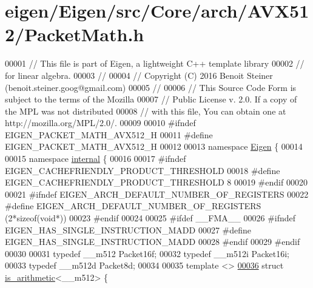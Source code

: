 \hypertarget{eigen_2_eigen_2src_2_core_2arch_2_a_v_x512_2_packet_math_8h_source}{}\section{eigen/\+Eigen/src/\+Core/arch/\+A\+V\+X512/\+Packet\+Math.h}
\label{eigen_2_eigen_2src_2_core_2arch_2_a_v_x512_2_packet_math_8h_source}

\begin{DoxyCode}
00001 \textcolor{comment}{// This file is part of Eigen, a lightweight C++ template library}
00002 \textcolor{comment}{// for linear algebra.}
00003 \textcolor{comment}{//}
00004 \textcolor{comment}{// Copyright (C) 2016 Benoit Steiner (benoit.steiner.goog@gmail.com)}
00005 \textcolor{comment}{//}
00006 \textcolor{comment}{// This Source Code Form is subject to the terms of the Mozilla}
00007 \textcolor{comment}{// Public License v. 2.0. If a copy of the MPL was not distributed}
00008 \textcolor{comment}{// with this file, You can obtain one at http://mozilla.org/MPL/2.0/.}
00009 
00010 \textcolor{preprocessor}{#ifndef EIGEN\_PACKET\_MATH\_AVX512\_H}
00011 \textcolor{preprocessor}{#define EIGEN\_PACKET\_MATH\_AVX512\_H}
00012 
00013 \textcolor{keyword}{namespace }\hyperlink{namespace_eigen}{Eigen} \{
00014 
00015 \textcolor{keyword}{namespace }\hyperlink{namespaceinternal}{internal} \{
00016 
00017 \textcolor{preprocessor}{#ifndef EIGEN\_CACHEFRIENDLY\_PRODUCT\_THRESHOLD}
00018 \textcolor{preprocessor}{#define EIGEN\_CACHEFRIENDLY\_PRODUCT\_THRESHOLD 8}
00019 \textcolor{preprocessor}{#endif}
00020 
00021 \textcolor{preprocessor}{#ifndef EIGEN\_ARCH\_DEFAULT\_NUMBER\_OF\_REGISTERS}
00022 \textcolor{preprocessor}{#define EIGEN\_ARCH\_DEFAULT\_NUMBER\_OF\_REGISTERS (2*sizeof(void*))}
00023 \textcolor{preprocessor}{#endif}
00024 
00025 \textcolor{preprocessor}{#ifdef \_\_FMA\_\_}
00026 \textcolor{preprocessor}{#ifndef EIGEN\_HAS\_SINGLE\_INSTRUCTION\_MADD}
00027 \textcolor{preprocessor}{#define EIGEN\_HAS\_SINGLE\_INSTRUCTION\_MADD}
00028 \textcolor{preprocessor}{#endif}
00029 \textcolor{preprocessor}{#endif}
00030 
00031 \textcolor{keyword}{typedef} \_\_m512 Packet16f;
00032 \textcolor{keyword}{typedef} \_\_m512i Packet16i;
00033 \textcolor{keyword}{typedef} \_\_m512d Packet8d;
00034 
00035 \textcolor{keyword}{template} <>
\hyperlink{struct_eigen_1_1internal_1_1is__arithmetic_3_01____m512_01_4}{00036} \textcolor{keyword}{struct }\hyperlink{struct_eigen_1_1internal_1_1is__arithmetic}{is\_arithmetic}<\_\_m512> \{

\end{DoxyCode}
